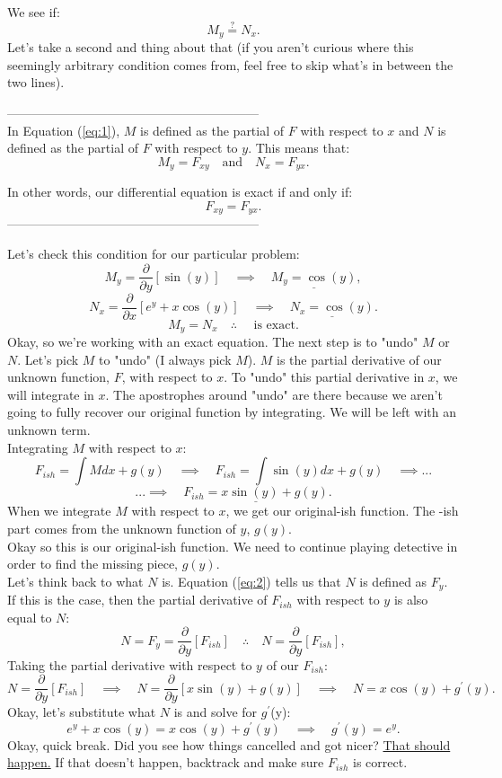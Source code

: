 \documentclass[a4paper,12pt]{article} %
\begin{document}
We see if:
$$ M_y \overset{?}= N_x. $$
Let's take a second and thing about that (if you aren't curious where this seemingly arbitrary condition comes from, feel free to skip what's in between the two lines).

------------------------------------------------------------\\
In Equation (\ref{eq:1}), $M$ is defined as the partial of $F$ with respect to $x$ and $N$ is defined as the partial of $F$ with respect to $y$. This means that:
\begin{equation}
	M_{y} = F_{xy} \quad \text{and} \quad N_{x} = F_{yx}.
	\label{eq:3}
\end{equation}

In other words, our differential equation is exact if and only if:
$$ F_{xy} = F_{yx}. $$
------------------------------------------------------------

Let's check this condition for our particular problem:
$$ M_y = \frac{\partial}{\partial y}[\sin(y)] \quad \implies  \quad \underline{M_{y} = \cos(y)}, $$
$$ N_x = \frac{\partial}{\partial x}[e^y + x\cos(y)] \quad\implies \quad \underline{N_x=\cos(y)}. $$
$$ \boxed{M_y = N_x \quad\therefore\quad \text{ is exact}.} $$
Okay, so we're working with an exact equation. The next step is to "undo" $M$ or $N$. Let's pick $M$ to "undo" (I always pick $M$). $M$ is the partial derivative of our unknown function, $F$, with respect to $x$. To "undo" this partial derivative in $x$, we will integrate in $x$. The apostrophes around "undo" are there because we aren't going to fully recover our original function by integrating. We will be left with an unknown term.\\

Integrating $M$ with respect to $x$:
$$F_{ish} = \int M dx + g(y) \quad\implies \quad F_{ish} = \int \sin(y)dx + g(y) \quad\implies ...$$
$$ ...\implies \quad \underline{F_{ish} = x\sin(y) + g(y)}. $$
When we integrate $M$ with respect to $x$, we get our original-ish function. The -ish part comes from the unknown function of $y$, $g(y)$.\\

Okay so this is our original-ish function. We need to continue playing detective in order to find the missing piece, $g(y)$. \\

Let's think back to what $N$ is. Equation (\ref{eq:2}) tells us that $N$ is defined as $F_y$. If this is the case, then the partial derivative of $F_{ish}$ with respect to $y$ is also equal to $N$:
$$ N = F_y = \frac{\partial}{\partial y}[F_{ish}] \quad \therefore \quad N = \frac{\partial}{\partial y}[F_{ish}], $$
Taking the partial derivative with respect to $y$ of our $F_{ish}$:
$$ N = \frac{\partial}{\partial y}[F_{ish}] \quad\implies \quad N = \frac{\partial}{\partial y}[x\sin(y) + g(y)] \quad\implies \quad N = x\cos(y) + g^{\prime}(y). $$
Okay, let's substitute what $N$ is and solve for $g^{\prime}$(y):
$$ e^y + x\cos(y) = x\cos(y) + g^{\prime}(y) \quad\implies \quad g^{\prime}(y) = e^y. $$
Okay, quick break. Did you see how things cancelled and got nicer? \underline{That should happen.} If that doesn't happen, backtrack and make sure $F_{ish}$ is correct.\\
\end{document}
